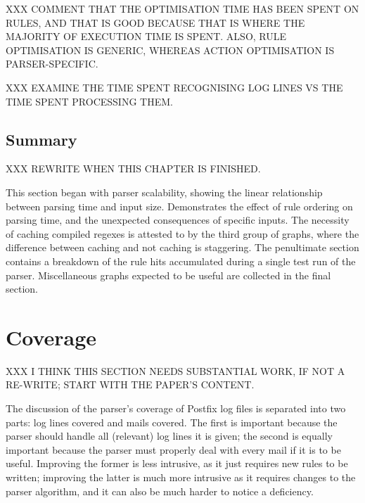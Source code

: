 \label{recognising vs processing}

XXX COMMENT THAT THE OPTIMISATION TIME HAS BEEN SPENT ON RULES, AND THAT IS
GOOD BECAUSE THAT IS WHERE THE MAJORITY OF EXECUTION TIME IS SPENT\@.
ALSO, RULE OPTIMISATION IS GENERIC, WHEREAS ACTION OPTIMISATION IS
PARSER-SPECIFIC\@.

XXX EXAMINE THE TIME SPENT RECOGNISING LOG LINES VS THE TIME SPENT
PROCESSING THEM\@.


\FloatBarrier{}

\subsection{Summary}

XXX REWRITE WHEN THIS CHAPTER IS FINISHED\@.

This section began with parser scalability, showing the linear relationship
between parsing time and input size.  Demonstrates the effect of rule
ordering on parsing time, and the unexpected consequences of specific
inputs.  The necessity of caching compiled regexes is attested to by the
third group of graphs, where the difference between caching and not caching
is staggering.  The penultimate section contains a breakdown of the rule
hits accumulated during a single test run of the parser.  Miscellaneous
graphs expected to be useful are collected in the final section.

\section{Coverage}

XXX I THINK THIS SECTION NEEDS SUBSTANTIAL WORK, IF NOT A RE-WRITE\@; START
WITH THE PAPER'S CONTENT\@.

\label{parsing coverage}

The discussion of the parser's coverage of Postfix log files is separated
into two parts: log lines covered and mails covered.  The first is
important because the parser should handle all (relevant) log lines it is
given; the second is equally important because the parser must properly
deal with every mail if it is to be useful.  Improving the former is
less intrusive, as it just requires new rules to be written; improving the
latter is much more intrusive as it requires changes to the parser
algorithm, and it can also be much harder to notice a deficiency.

